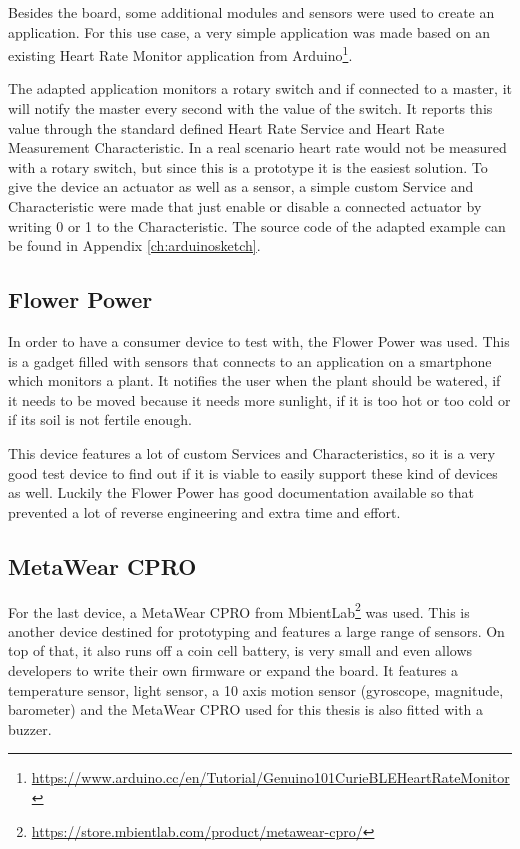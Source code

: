 \documentclass[pdftex,a4paper,12pt,twoside]{report}
\begin{document}
Besides the board, some additional modules and sensors were used to create an application. For this use case, a very simple application was made based on an existing Heart Rate Monitor application from Arduino\footnote{\url{https://www.arduino.cc/en/Tutorial/Genuino101CurieBLEHeartRateMonitor}}.

The adapted application monitors a rotary switch and if connected to a master, it will notify the master every second with the value of the switch. It reports this value through the standard defined Heart Rate Service and Heart Rate Measurement Characteristic. In a real scenario heart rate would not be measured with a rotary switch, but since this is a prototype it is the easiest solution. To give the device an actuator as well as a sensor, a simple custom Service and Characteristic were made that just enable or disable a connected actuator by writing 0 or 1 to the Characteristic. The source code of the adapted example can be found in Appendix \ref{ch:arduinosketch}.

\subsection{Flower Power}
\label{subsec:flowerpower}
In order to have a consumer device to test with, the Flower Power was used. This is a gadget filled with sensors that connects to an application on a smartphone which monitors a plant. It notifies the user when the plant should be watered, if it needs to be moved because it needs more sunlight, if it is too hot or too cold or if its soil is not fertile enough.

This device features a lot of custom Services and Characteristics, so it is a very good test device to find out if it is viable to easily support these kind of devices as well. Luckily the Flower Power has good documentation available so that prevented a lot of reverse engineering and extra time and effort.

\subsection{MetaWear CPRO}
\label{subsec:metawearcpro}
For the last device, a MetaWear CPRO from MbientLab\footnote{\url{https://store.mbientlab.com/product/metawear-cpro/}} was used. This is another device destined for prototyping and features a large range of sensors. On top of that, it also runs off a coin cell battery, is very small and even allows developers to write their own firmware or expand the board. It features a temperature sensor, light sensor, a 10 axis motion sensor (gyroscope, magnitude, barometer) and the MetaWear CPRO used for this thesis is also fitted with a buzzer.
\end{document}
